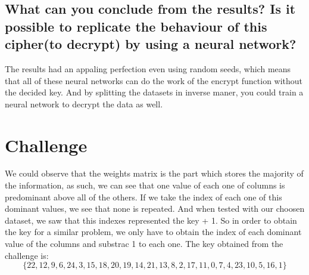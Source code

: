 \documentclass{article}
\begin{document}
\subsection*{What can you conclude from the results? Is it possible to replicate the behaviour of this cipher(to decrypt) by using a neural network?}
The results had an appaling perfection even using random seeds, which means that all of these neural networks can do the work of the encrypt function without the decided key. And by splitting the datasets in inverse maner, you could train a neural network to decrypt the data as well.
\section{Challenge}
We could observe that the weights matrix is the part which stores the majority of the information, as such, we can see that one value of each one of columns is predominant above all of the others. If we take the index of each one of this dominant values, we see that none is repeated. And when tested with our choosen dataset, we saw that this indexes represented the key + 1. So in order to obtain the key for a similar problem, we only have to obtain the index of each dominant value of the columns and substrac 1 to each one.
The key obtained from the challenge is:
\[\{22, 12, 9, 6, 24, 3, 15, 18, 20, 19, 14, 21, 13, 8, 2, 17, 11, 0, 7, 4, 23, 10, 5, 16, 1\}\]
\end{document}
